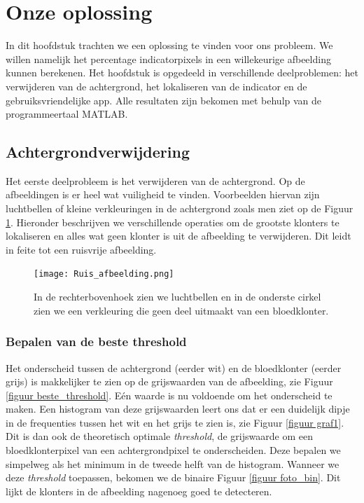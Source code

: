 \documentclass[a4paper,kulak]{kulakarticle}
\begin{document}
\section{Onze oplossing}
In dit hoofdstuk trachten we een oplossing te vinden voor ons probleem. We willen namelijk het percentage indicatorpixels in een willekeurige afbeelding kunnen berekenen. Het hoofdstuk is opgedeeld in verschillende deelproblemen: het verwijderen van de achtergrond, het lokaliseren van de indicator en de gebruiksvriendelijke app. Alle resultaten zijn bekomen met behulp van de programmeertaal MATLAB.


\subsection{Achtergrondverwijdering} \label{Achtergrondverwijdering}
Het eerste deelprobleem is het verwijderen van de achtergrond. Op de afbeeldingen is er heel wat vuiligheid te vinden. Voorbeelden hiervan zijn luchtbellen of kleine verkleuringen in de achtergrond zoals men ziet op de Figuur \ref{figuur achtergrondverwijdering}. Hieronder beschrijven we verschillende operaties om de grootste klonters te lokaliseren en alles wat geen klonter is uit de afbeelding te verwijderen. Dit leidt in feite tot een ruisvrije afbeelding.

\begin{figure}[H]
	\centering
	\texttt{[image: Ruis\_afbeelding.png]}	
	\caption{In de rechterbovenhoek zien we luchtbellen en in de onderste cirkel zien we een verkleuring die geen deel uitmaakt van een bloedklonter.}
	\label{figuur achtergrondverwijdering}
\end{figure}

\subsubsection{Bepalen van de beste threshold}
Het onderscheid tussen de achtergrond (eerder wit) en de bloedklonter (eerder grijs) is makkelijker te zien op de grijswaarden van de afbeelding, zie Figuur \ref{figuur beste_threshold}. Eén waarde is nu voldoende om het onderscheid te maken. Een histogram van deze grijswaarden leert ons dat er een duidelijk dipje in de frequenties tussen het wit en het grijs te zien is, zie Figuur \ref{figuur graf1}. Dit is dan ook de theoretisch optimale \textit{threshold}, de grijswaarde om een bloedklonterpixel van een achtergrondpixel te onderscheiden. Deze bepalen we simpelweg als het minimum in de tweede helft van de histogram. Wanneer we deze \textit{threshold} toepassen, bekomen we de binaire Figuur \ref{figuur foto_bin}. Dit lijkt de klonters in de afbeelding nagenoeg goed te detecteren.
\end{document}
